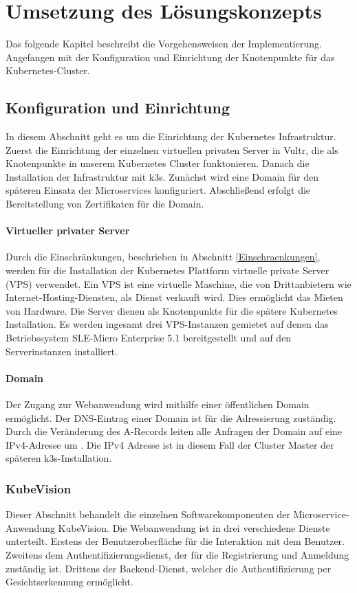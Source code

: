 \chapter{Umsetzung des Lösungskonzepts}

Das folgende Kapitel beschreibt die Vorgehensweisen der Implementierung.
Angefangen mit der Konfiguration und Einrichtung der Knotenpunkte für das Kubernetes-Cluster.


\section{Konfiguration und Einrichtung}

In diesem Abschnitt geht es um die Einrichtung der Kubernetes Infrastruktur.
Zuerst die Einrichtung der einzelnen virtuellen privaten Server in Vultr, die als Knotenpunkte in unserem Kubernetes Cluster funktonieren.
Danach die Installation der Infrastruktur mit k3s.
Zunächst wird eine Domain für den späteren Einsatz der Microservices konfiguriert.
Abschließend erfolgt die Bereitstellung von Zertifikaten für die Domain.

\subsubsection{Virtueller privater Server}

Durch die Einschränkungen, beschrieben in Abschnitt \ref{Einschraenkungen},
werden für die Installation der Kubernetes Plattform virtuelle private Server (VPS) verwendet.
Ein VPS ist eine virtuelle Maschine, die von Drittanbietern wie Internet-Hosting-Diensten, als Dienst verkauft wird.
Dies ermöglicht das Mieten von Hardware.
Die Server dienen als Knotenpunkte für die spätere Kubernetes Installation.
Es werden ingesamt drei VPS-Instanzen gemietet auf denen das Betriebssystem SLE-Micro Enterprise 5.1 bereitgestellt und auf den Serverinstanzen installiert.

\subsubsection{Domain}
Der Zugang zur Webanwendung wird mithilfe einer öffentlichen Domain ermöglicht.
Der DNS-Eintrag einer Domain ist für die Adressierung zuständig.
Durch die Veränderung des A-Records leiten alle Anfragen der Domain auf eine IPv4-Adresse um \cite{LearningCoreDNS}.
Die IPv4 Adresse ist in diesem Fall der Cluster Master der späteren k3s-Installation.

\subsection{KubeVision}
Dieser Abschnitt behandelt die einzelnen Softwarekomponenten der Microservice-Anwendung KubeVision.
Die Webanwendung ist in drei verschiedene Dienste unterteilt.
Erstens der Benutzeroberfläche für die Interaktion mit dem Benutzer.
Zweitens dem Authentifizierungsdienst, der für die Registrierung und Anmeldung zuständig ist.
Drittens der Backend-Dienst, welcher die Authentifizierung per Gesichtserkennung ermöglicht.

